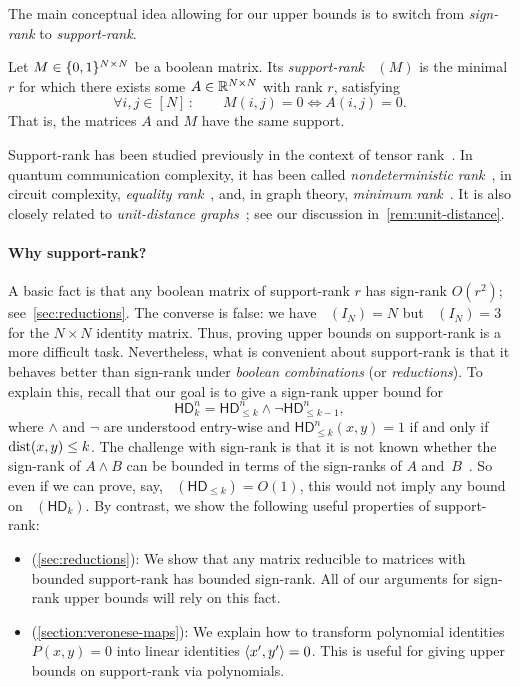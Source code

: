 \documentclass[conference]{IEEEtran}
\DeclareMathOperator{\signrank}{rank_\pm}
\DeclareMathOperator{\suprank}{rank_0}
\newcommand{\HD}[1]{\mathsf{HD}_{#1}}
\begin{document}
The main conceptual idea allowing for our upper bounds is to switch from \emph{sign-rank} to \emph{support-rank}.

\begin{definition}
Let $M \in \{0,1\}^{N \times N}$ be a boolean matrix. Its \emph{support-rank} $\suprank(M)$ is the minimal $r$ for which there exists some $A \in \mathbb{R}^{N \times N}$ with rank $r$, satisfying
\[
    \forall i,j \in [N]\,\colon\qquad M(i,j) = 0 \iff A(i,j) = 0 .
\]
That is, the matrices $A$ and $M$ have the same support.
\end{definition}
Support-rank has been studied previously in the context of tensor rank~\cite{CU13,BCZ17,BCZ18}. In quantum communication complexity, it has been called \emph{nondeterministic rank}~\cite{dWol03}, in circuit complexity, \emph{equality rank}~\cite{HP2010}, and, in graph theory, \emph{minimum rank}~\cite{FH07}. It is also closely related to \emph{unit-distance graphs}~\cite{EHT65,AK14}; see our discussion in~\cref{rem:unit-distance}.

\paragraph{Why support-rank?}
A basic fact is that any boolean matrix of support-rank $r$ has sign-rank $O(r^2)$; see~\cref{sec:reductions}. The converse is false: we have $\suprank(I_N)=N$ but $\signrank(I_N)=3$ for the $N\times N$ identity matrix. Thus, proving upper bounds on support-rank is a more difficult task. Nevertheless, what is convenient about support-rank is that it behaves better than sign-rank under \emph{boolean combinations} (or \emph{reductions}). To explain this, recall that our goal is to give a sign-rank upper bound for
\[
    \HD{k}^n = \HD{\leq k}^n \wedge \neg \HD{\leq k-1}^n,
\]
where $\land$ and $\neg$ are understood entry-wise and $\HD{\leq k}^n(x,y) = 1$ if and only if $\operatorname{dist}(x,y) \leq k$. The challenge with sign-rank is that it is
not known whether the sign-rank of $A \wedge B$ can be bounded in terms of the sign-ranks of $A$ and~$B$~\cite{BMT21,HHPTZ22}.  So even if we can prove, say, $\signrank(\HD{\leq k}) =
O(1)$, this would not imply any bound on $\signrank(\HD{k})$. By contrast, we show the following useful properties of support-rank:
\begin{itemize}[itemsep=0pt]
	\item (\cref{sec:reductions}): We show that any matrix reducible to matrices with bounded support-rank has bounded sign-rank. All of our arguments for sign-rank upper bounds will rely on this fact.
	\item (\cref{section:veronese-maps}): We explain how to  transform polynomial identities $P(x,y) = 0$ into linear identities $\langle x',y' \rangle = 0$. This is useful for giving upper bounds on support-rank via polynomials.
\end{itemize}
\end{document}
